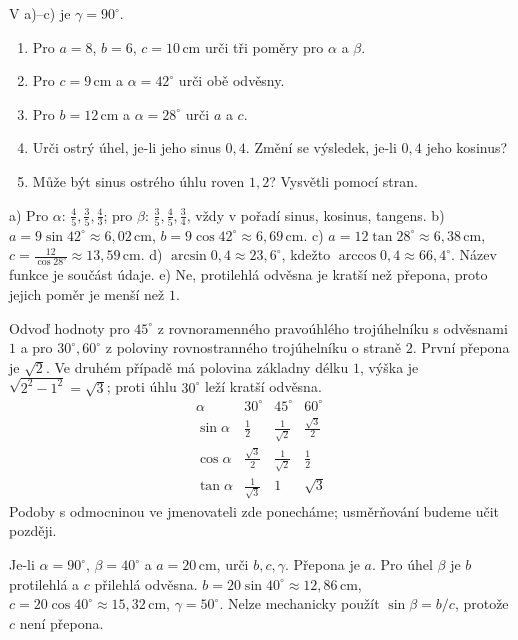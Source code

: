 \documentclass[11pt,a4paper]{article}
\begin{document}
\begin{zadaniReseniBox}[title={S1: pojmenuj strany před dosazením},breakable=false]
V a)–c) je $\gamma=90^\circ$.
\begin{enumerate}[label=\alph*)]
\item Pro $a=8$, $b=6$, $c=10\,\mathrm{cm}$ urči tři poměry pro $\alpha$ a $\beta$.
\item Pro $c=9\,\mathrm{cm}$ a $\alpha=42^\circ$ urči obě odvěsny.
\item Pro $b=12\,\mathrm{cm}$ a $\alpha=28^\circ$ urči $a$ a $c$.
\item Urči ostrý úhel, je-li jeho sinus $0{,}4$. Změní se výsledek, je-li $0{,}4$ jeho kosinus?
\item Může být sinus ostrého úhlu roven $1{,}2$? Vysvětli pomocí stran.
\end{enumerate}
\tcblower
a) Pro $\alpha$: $\frac45,\frac35,\frac43$; pro $\beta$:
$\frac35,\frac45,\frac34$, vždy v pořadí sinus, kosinus, tangens.
b) $a=9\sin42^\circ\approx6{,}02\,\mathrm{cm}$,
$b=9\cos42^\circ\approx6{,}69\,\mathrm{cm}$.
c) $a=12\tan28^\circ\approx6{,}38\,\mathrm{cm}$,
$c=\frac{12}{\cos28^\circ}\approx13{,}59\,\mathrm{cm}$.
d) $\arcsin0{,}4\approx23{,}6^\circ$, kdežto $\arccos0{,}4\approx66{,}4^\circ$.
Název funkce je součást údaje.
e) Ne, protilehlá odvěsna je kratší než přepona, proto jejich poměr je menší než $1$.
\end{zadaniReseniBox}

\newpage
{}
\begin{zadaniReseniBox}[title={R1: odvození zvláštních hodnot, 12–18 minut},breakable=false]
Odvoď hodnoty pro $45^\circ$ z rovnoramenného pravoúhlého trojúhelníku
s odvěsnami $1$ a pro $30^\circ,60^\circ$ z poloviny rovnostranného trojúhelníku o straně $2$.
\tcblower
První přepona je $\sqrt2$. Ve druhém případě má polovina základny délku $1$,
výška je $\sqrt{2^2-1^2}=\sqrt3$; proti úhlu $30^\circ$ leží kratší odvěsna.
\[
\begin{array}{c|ccc}
\alpha&30^\circ&45^\circ&60^\circ\\\hline
\sin\alpha&\frac12&\frac1{\sqrt2}&\frac{\sqrt3}{2}\\[1mm]
\cos\alpha&\frac{\sqrt3}{2}&\frac1{\sqrt2}&\frac12\\[1mm]
\tan\alpha&\frac1{\sqrt3}&1&\sqrt3
\end{array}
\]
Podoby s odmocninou ve jmenovateli zde ponecháme; usměrňování budeme učit později.
\end{zadaniReseniBox}
\begin{zadaniReseniBox}[title={R2: pravý úhel u jiného vrcholu},breakable=false]
Je-li $\alpha=90^\circ$, $\beta=40^\circ$ a $a=20\,\mathrm{cm}$, urči $b,c,\gamma$.
\tcblower
Přepona je $a$. Pro úhel $\beta$ je $b$ protilehlá a $c$ přilehlá odvěsna.
$b=20\sin40^\circ\approx12{,}86\,\mathrm{cm}$,
$c=20\cos40^\circ\approx15{,}32\,\mathrm{cm}$, $\gamma=50^\circ$.
Nelze mechanicky použít $\sin\beta=b/c$, protože $c$ není přepona.
\end{zadaniReseniBox}
\end{document}
